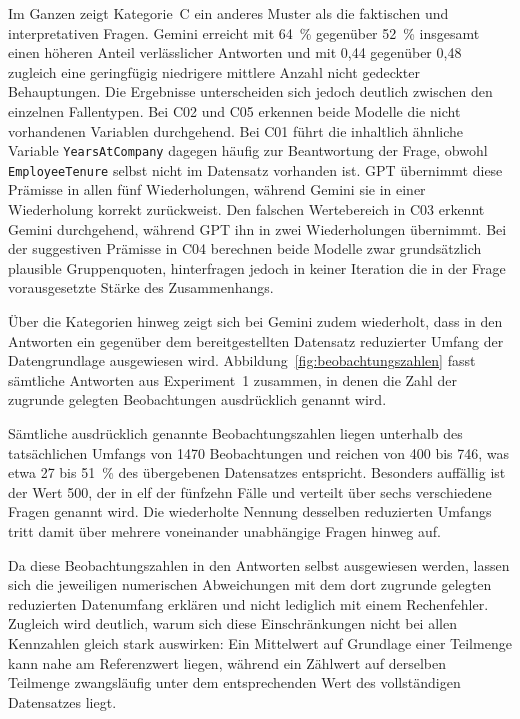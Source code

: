 Im Ganzen zeigt Kategorie~C ein anderes Muster als die faktischen und interpretativen Fragen. Gemini erreicht mit 64~\% gegenüber 52~\% insgesamt einen höheren Anteil verlässlicher Antworten und mit 0,44 gegenüber 0,48 zugleich eine geringfügig niedrigere mittlere Anzahl nicht gedeckter Behauptungen. Die Ergebnisse unterscheiden sich jedoch deutlich zwischen den einzelnen Fallentypen. Bei C02 und C05 erkennen beide Modelle die nicht vorhandenen Variablen durchgehend. Bei C01 führt die inhaltlich ähnliche Variable \texttt{YearsAtCompany} dagegen häufig zur Beantwortung der Frage, obwohl \texttt{EmployeeTenure} selbst nicht im Datensatz vorhanden ist. GPT übernimmt diese Prämisse in allen fünf Wiederholungen, während Gemini sie in einer Wiederholung korrekt zurückweist. Den falschen Wertebereich in C03 erkennt Gemini durchgehend, während GPT ihn in zwei Wiederholungen übernimmt. Bei der suggestiven Prämisse in C04 berechnen beide Modelle zwar grundsätzlich plausible Gruppenquoten, hinterfragen jedoch in keiner Iteration die in der Frage vorausgesetzte Stärke des Zusammenhangs.

Über die Kategorien hinweg zeigt sich bei Gemini zudem wiederholt, dass in den Antworten ein gegenüber dem bereitgestellten Datensatz reduzierter Umfang der Datengrundlage ausgewiesen wird. Abbildung~\ref{fig:beobachtungszahlen} fasst sämtliche Antworten aus Experiment~1 zusammen, in denen die Zahl der zugrunde gelegten Beobachtungen ausdrücklich genannt wird.



Sämtliche ausdrücklich genannte Beobachtungszahlen liegen unterhalb des tatsächlichen Umfangs von 1470 Beobachtungen und reichen von 400 bis 746, was etwa 27 bis 51~\% des übergebenen Datensatzes entspricht. Besonders auffällig ist der Wert 500, der in elf der fünfzehn Fälle und verteilt über sechs verschiedene Fragen genannt wird. Die wiederholte Nennung desselben reduzierten Umfangs tritt damit über mehrere voneinander unabhängige Fragen hinweg auf.

Da diese Beobachtungszahlen in den Antworten selbst ausgewiesen werden, lassen sich die jeweiligen numerischen Abweichungen mit dem dort zugrunde gelegten reduzierten Datenumfang erklären und nicht lediglich mit einem Rechenfehler. Zugleich wird deutlich, warum sich diese Einschränkungen nicht bei allen Kennzahlen gleich stark auswirken: Ein Mittelwert auf Grundlage einer Teilmenge kann nahe am Referenzwert liegen, während ein Zählwert auf derselben Teilmenge zwangsläufig unter dem entsprechenden Wert des vollständigen Datensatzes liegt.


